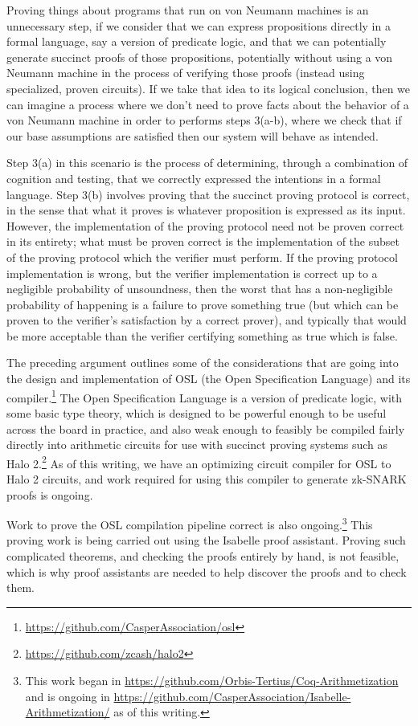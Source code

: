 \documentclass[11pt]{article}
\begin{document}
Proving things about programs that run on von Neumann machines is an unnecessary step,
if we consider that we can express propositions directly in a formal language, say a
version of predicate logic, and that we can potentially generate succinct proofs of
those propositions, potentially without using a von Neumann machine in the process
of verifying those proofs (instead using specialized, proven circuits). If we take
that idea to its logical conclusion, then we can imagine a process where we don't need
to prove facts about the behavior of a von Neumann machine in order to performs steps
3(a-b), where we check that if our base assumptions are satisfied then our system
will behave as intended.

Step 3(a) in this scenario is the process of determining,
through a combination of cognition and testing, that we correctly expressed the
intentions in a formal language. Step 3(b) involves proving that the succinct
proving protocol is correct, in the sense that what it proves is whatever proposition
is expressed as its input. However, the implementation of the proving protocol need
not be proven correct in its entirety; what must be proven correct is the implementation
of the subset of the proving protocol which the verifier must perform. If the proving
protocol implementation is wrong, but the verifier implementation is correct up to a
negligible probability of unsoundness, then the worst that has a non-negligible probability
of happening is a failure to prove something true (but which can be proven to the
verifier's satisfaction by a correct prover), and typically that would be more acceptable than
the verifier certifying something as true which is false.

The preceding argument outlines some of the considerations that are going into the
design and implementation of OSL (the Open Specification Language) and its
compiler.\footnote{\url{https://github.com/CasperAssociation/osl}}
The Open Specification Language is a version of predicate logic, with some basic type theory,
which is designed to be powerful enough to be useful across the board in practice, and also weak enough
to feasibly be compiled fairly directly into arithmetic circuits
for use with succinct proving systems such as Halo 2.\footnote{\url{https://github.com/zcash/halo2}}
As of this writing, we have an optimizing circuit compiler for OSL to Halo 2 circuits,
and work required for using this compiler to generate zk-SNARK proofs is ongoing.

Work to prove the OSL compilation pipeline correct is also ongoing.\footnote{This work began in
\url{https://github.com/Orbis-Tertius/Coq-Arithmetization} and is ongoing in
\url{https://github.com/CasperAssociation/Isabelle-Arithmetization/} as of this writing.}
This proving work is being carried out using the Isabelle proof assistant. Proving such complicated
theorems, and checking the proofs entirely by hand, is not feasible, which is why proof
assistants are needed to help discover the proofs and to check them.
\end{document}
